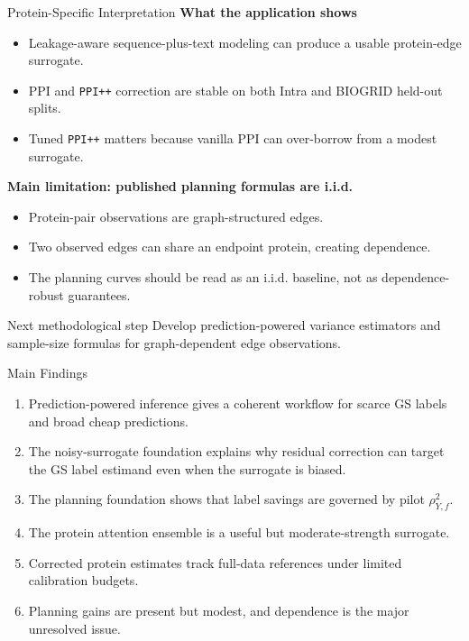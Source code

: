 \documentclass[aspectratio=169,10pt]{beamer}
\newcommand{\PPIPP}{\texttt{PPI++}}
\begin{document}
\begin{frame}{Protein-Specific Interpretation}
\textbf{What the application shows}
\begin{itemize}
  \item Leakage-aware sequence-plus-text modeling can produce a usable protein-edge surrogate.
  \item PPI and \PPIPP{} correction are stable on both Intra and BIOGRID held-out splits.
  \item Tuned \PPIPP{} matters because vanilla PPI can over-borrow from a modest surrogate.
\end{itemize}

\vspace{0.15cm}
\textbf{Main limitation: published planning formulas are i.i.d.}
\begin{itemize}
  \item Protein-pair observations are graph-structured edges.
  \item Two observed edges can share an endpoint protein, creating dependence.
  \item The planning curves should be read as an i.i.d. baseline, not as dependence-robust guarantees.
\end{itemize}

\begin{block}{Next methodological step}
Develop prediction-powered variance estimators and sample-size formulas for graph-dependent edge observations.
\end{block}
\end{frame}

\begin{frame}{Main Findings}
\begin{enumerate}
  \item Prediction-powered inference gives a coherent workflow for scarce GS labels and broad cheap predictions.
  \item The noisy-surrogate foundation explains why residual correction can target the GS label estimand even when the surrogate is biased.
  \item The planning foundation shows that label savings are governed by pilot \(\rho^2_{Y,f}\).
  \item The protein attention ensemble is a useful but moderate-strength surrogate.
  \item Corrected protein estimates track full-data references under limited calibration budgets.
  \item Planning gains are present but modest, and dependence is the major unresolved issue.
\end{enumerate}
\end{frame}
\end{document}
